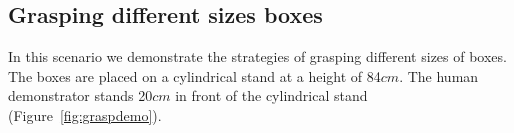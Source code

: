 \subsection{Grasping different sizes boxes}
\label{cha5:sec3:graspsize}
In this scenario we demonstrate the strategies of grasping different sizes of boxes. The boxes are placed on a cylindrical stand at a height of 84$cm$. The human demonstrator stands 20$cm$ in front of the cylindrical stand (Figure~\ref{fig:graspdemo}).

\begin{figure}
  \centering

\end{figure}

